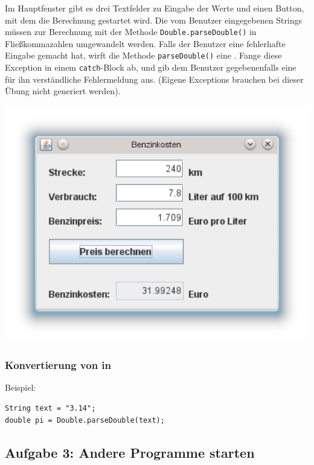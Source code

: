 Im Hauptfenster gibt es drei Textfelder zu Eingabe der Werte und einen Button,
mit dem die Berechnung gestartet wird. Die vom Benutzer eingegebenen Strings
müssen zur Berechnung mit der Methode \lstinline|Double.parseDouble()| in
Fließkommazahlen umgewandelt werden. Falls der Benutzer eine fehlerhafte
Eingabe gemacht hat, wirft die Methode \lstinline|parseDouble()| eine
. Fange diese Exception in einem
\lstinline|catch|-Block ab, und gib dem Benutzer gegebenenfalls eine für ihn
verständliche Fehlermeldung aus. (Eigene Exceptions brauchen bei dieser Übung
nicht generiert werden).

\begin{minipage}{0.5\textwidth}
\includegraphics[width=1.0\textwidth]{./inf/SEKII/25_Java_Exceptions/Benzinkosten.png}
\end{minipage}
\hfill
\begin{minipage}{0.5\textwidth}
\subsubsection{Konvertierung von  in }

Beispiel:

\begin{lstlisting}
String text = "3.14";
double pi = Double.parseDouble(text);
\end{lstlisting}
\end{minipage}


\subsection{Aufgabe 3: Andere Programme starten}

